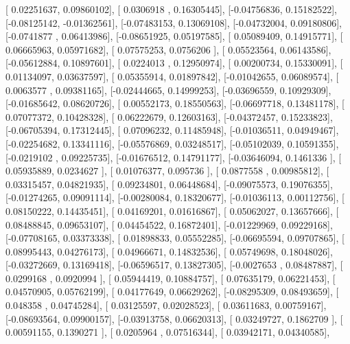 \documentclass{article}
\begin{document}
       [ 0.02251637,  0.09860102],
       [ 0.0306918 ,  0.16305445],
       [-0.04756836,  0.15182522],
       [-0.08125142, -0.01362561],
       [-0.07483153,  0.13069108],
       [-0.04732004,  0.09180806],
       [-0.0741877 ,  0.06413986],
       [-0.08651925,  0.05197585],
       [ 0.05089409,  0.14915771],
       [ 0.06665963,  0.05971682],
       [ 0.07575253,  0.0756206 ],
       [ 0.05523564,  0.06143586],
       [-0.05612884,  0.10897601],
       [ 0.0224013 ,  0.12950974],
       [ 0.00200734,  0.15330091],
       [ 0.01134097,  0.03637597],
       [ 0.05355914,  0.01897842],
       [-0.01042655,  0.06089574],
       [ 0.0063577 ,  0.09381165],
       [-0.02444665,  0.14999253],
       [-0.03696559,  0.10929309],
       [-0.01685642,  0.08620726],
       [ 0.00552173,  0.18550563],
       [-0.06697718,  0.13481178],
       [ 0.07077372,  0.10428328],
       [ 0.06222679,  0.12603163],
       [-0.04372457,  0.15233823],
       [-0.06705394,  0.17312445],
       [ 0.07096232,  0.11485948],
       [-0.01036511,  0.04949467],
       [-0.02254682,  0.13341116],
       [-0.05576869,  0.03248517],
       [-0.05102039,  0.10591355],
       [-0.0219102 ,  0.09225735],
       [-0.01676512,  0.14791177],
       [-0.03646094,  0.1461336 ],
       [ 0.05935889,  0.0234627 ],
       [ 0.01076377,  0.095736  ],
       [ 0.0877558 ,  0.00985812],
       [ 0.03315457,  0.04821935],
       [ 0.09234801,  0.06448684],
       [-0.09075573,  0.19076355],
       [-0.01274265,  0.09091114],
       [-0.00280084,  0.18320677],
       [-0.01036113,  0.00112756],
       [ 0.08150222,  0.14435451],
       [ 0.04169201,  0.01616867],
       [ 0.05062027,  0.13657666],
       [ 0.08488845,  0.09653107],
       [ 0.04454522,  0.16872401],
       [-0.01229969,  0.09229168],
       [-0.07708165,  0.03373338],
       [ 0.01898833,  0.05552285],
       [-0.06695594,  0.09707865],
       [ 0.08995443,  0.04276173],
       [ 0.04966671,  0.14832536],
       [ 0.05749698,  0.18048026],
       [-0.03272669,  0.13169418],
       [-0.06596517,  0.13827305],
       [-0.0027653 ,  0.08487887],
       [ 0.0299168 ,  0.0920994 ],
       [ 0.05944419,  0.10884757],
       [ 0.07635179,  0.06221453],
       [ 0.04570905,  0.05762199],
       [ 0.04177649,  0.06629262],
       [-0.08295309,  0.08493659],
       [ 0.048358  ,  0.04745284],
       [ 0.03125597,  0.02028523],
       [ 0.03611683,  0.00759167],
       [-0.08693564,  0.09900157],
       [-0.03913758,  0.06620313],
       [ 0.03249727,  0.1862709 ],
       [ 0.00591155,  0.1390271 ],
       [ 0.0205964 ,  0.07516344],
       [ 0.03942171,  0.04340585],
\end{document}
